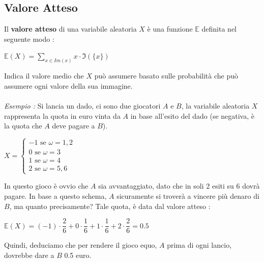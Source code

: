 \documentclass[12pt, letterpaper]{article}
\begin{document}
\subsection{Valore Atteso}
Il \textbf{valore atteso} di una variabile aleatoria \(X\) è una funzione \(\mathbb{E}\) definita nel seguente modo :\begin{center}
   \( \mathbb{E}(X)=\displaystyle\sum_{x\in Im(x)}x\cdot \Im(\{x\})\)
\end{center}
Indica il valore medio che \(X\) può assumere basato sulle probabilità che può assumere ogni valore della sua immagine.
\\\hphantom{}\\\textit{Esempio :} Si lancia un dado, ci sono due giocatori \(A\) e \(B\), la variabile aleatoria \(X\) 
rappresenta la quota in euro vinta da \(A\) in base all'esito del dado (se negativa, è la quota che \(A\) deve pagare 
a \(B\)).\begin{center}
    \(
    X=\begin{cases}
        -1\text{ se }\omega=1,2\\
        0\text{ se  }\omega=3\\
        1\text{  se }\omega=4\\
        2\text{ se  }\omega=5,6
    \end{cases}    
    \)
\end{center}
In questo gioco è ovvio che \(A\) sia avvantaggiato, dato che in soli 2 esiti su 6 dovrà pagare. 
In base a questo schema, \(A\) sicuramente si troverà a vincere più denaro di \(B\), ma quanto precisamente?
Tale quota, è data dal valore atteso :\begin{center}
    \(
    \mathbb{E}(X)=(-1)\cdot\dfrac{2}{6}+0\cdot\dfrac{1}{6}+1\cdot\dfrac{1}{6}+2\cdot\dfrac{2}{6} =0.5   
    \)
\end{center}
Quindi, deduciamo che per rendere il gioco equo, \(A\) prima di ogni lancio, dovrebbe 
dare a \(B\) 0.5 euro.
 
\end{document}
